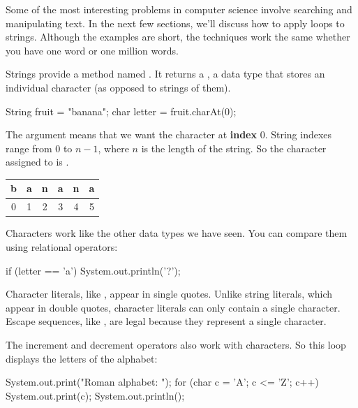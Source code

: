 Some of the most interesting problems in computer science involve searching and manipulating text.
In the next few sections, we'll discuss how to apply loops to strings.
Although the examples are short, the techniques work the same whether you have one word or one million words.


Strings provide a method named .
It returns a , a data type that stores an individual character (as opposed to strings of them).

\begin{code}
String fruit = "banana";
char letter = fruit.charAt(0);
\end{code}

The argument  means that we want the character at {\bf index} 0.
String indexes range from 0 to $n-1$, where $n$ is the length of the string.
So the character assigned to  is .

\begin{center}
\ttfamily
\begin{tabular}{cccccc}
\hline
\multicolumn{1}{|l|}{b} & \multicolumn{1}{l|}{a} & \multicolumn{1}{l|}{n} & \multicolumn{1}{l|}{a} & \multicolumn{1}{l|}{n} & \multicolumn{1}{l|}{a} \\ \hline
0                       & 1                      & 2                      & 3                      & 4                      & 5
\end{tabular}
\end{center}


Characters work like the other data types we have seen.
You can compare them using relational operators:

\begin{code}
if (letter == 'a') {
    System.out.println('?');
}
\end{code}


Character literals, like , appear in single quotes.
Unlike string literals, which appear in double quotes, character literals can only contain a single character.
Escape sequences, like , are legal because they represent a single character.

The increment and decrement operators also work with characters.
So this loop displays the letters of the alphabet:

\begin{code}
System.out.print("Roman alphabet: ");
for (char c = 'A'; c <= 'Z'; c++) {
    System.out.print(c);
}
System.out.println();
\end{code}

